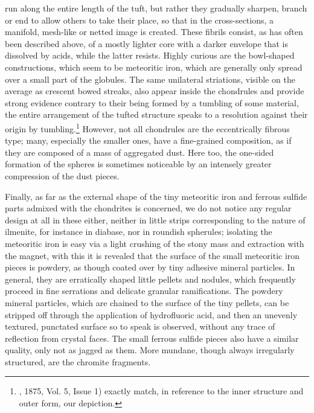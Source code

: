 \documentclass[a4paper, 12pt, oneside]{article}
\begin{document}
run along the entire length of the tuft, but rather they gradually sharpen, branch or end to allow others to take their place, so that in the cross-sections, a manifold, mesh-like or netted image is created. These fibrils consist, as has often been described above, of a mostly lighter core with a darker envelope that is dissolved by acids, while the latter resists. Highly curious are the bowl-shaped constructions, which seem to be meteoritic iron, which are generally only spread over a small part of the globules. The same unilateral striations, visible on the average as crescent bowed streaks, also appear inside the chondrules and provide strong evidence contrary to their being formed by a tumbling of some material, the entire arrangement of the tufted structure speaks to a resolution against their origin by tumbling.\footnote{, 1875, Vol. 5, Issue 1) exactly match, in reference to the inner structure and outer form, our depiction.} However, not all chondrules are the eccentrically fibrous type; many, especially the smaller ones, have a fine-grained composition, as if they are composed of a mass of aggregated dust. Here too, the one-sided formation of the spheres is sometimes noticeable by an intensely greater compression of the dust pieces.

Finally, as far as the external shape of the tiny meteoritic iron and ferrous sulfide parts admixed with the chondrites is concerned, we do not notice any regular design at all in these either, neither in little strips corresponding to the nature of ilmenite, for instance in diabase, nor in roundish spherules; isolating the meteoritic iron is easy via a light crushing of the stony mass and extraction with the magnet, with this it is revealed that the surface of the small meteoritic iron pieces is powdery, as though coated over by tiny adhesive mineral particles. In general, they are erratically shaped little pellets and nodules, which frequently proceed in fine serrations and delicate granular ramifications. The powdery mineral particles, which are chained to the surface of the tiny pellets, can be stripped off through the application of hydrofluoric acid, and then an unevenly textured, punctated surface so to speak is observed, without any trace of reflection from crystal faces. The small ferrous sulfide pieces also have a similar quality, only not as jagged as them. More mundane, though always irregularly structured, are the chromite fragments.
\end{document}
